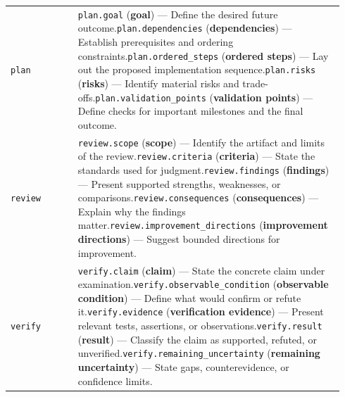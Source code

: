 \begin{longtable}{@{}L{0.19\linewidth}L{0.75\linewidth}@{}}
\texttt{plan} & \texttt{plan.goal} (\textbf{goal}) --- Define the desired future outcome.\newline{}\texttt{plan.dependencies} (\textbf{dependencies}) --- Establish prerequisites and ordering constraints.\newline{}\texttt{plan.ordered\_steps} (\textbf{ordered steps}) --- Lay out the proposed implementation sequence.\newline{}\texttt{plan.risks} (\textbf{risks}) --- Identify material risks and trade-offs.\newline{}\texttt{plan.validation\_points} (\textbf{validation points}) --- Define checks for important milestones and the final outcome. \\
\texttt{review} & \texttt{review.scope} (\textbf{scope}) --- Identify the artifact and limits of the review.\newline{}\texttt{review.criteria} (\textbf{criteria}) --- State the standards used for judgment.\newline{}\texttt{review.findings} (\textbf{findings}) --- Present supported strengths, weaknesses, or comparisons.\newline{}\texttt{review.consequences} (\textbf{consequences}) --- Explain why the findings matter.\newline{}\texttt{review.improvement\_directions} (\textbf{improvement directions}) --- Suggest bounded directions for improvement. \\
\texttt{verify} & \texttt{verify.claim} (\textbf{claim}) --- State the concrete claim under examination.\newline{}\texttt{verify.observable\_condition} (\textbf{observable condition}) --- Define what would confirm or refute it.\newline{}\texttt{verify.evidence} (\textbf{verification evidence}) --- Present relevant tests, assertions, or observations.\newline{}\texttt{verify.result} (\textbf{result}) --- Classify the claim as supported, refuted, or unverified.\newline{}\texttt{verify.remaining\_uncertainty} (\textbf{remaining uncertainty}) --- State gaps, counterevidence, or confidence limits. \\
\end{longtable}
\endgroup

